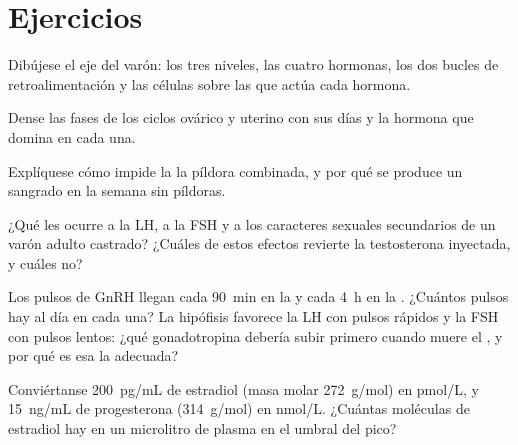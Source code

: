 \section{Ejercicios}

\begin{exercise}[$\star$]\label{exo:b2:reproductive-hormones:1}
Dibújese el eje del varón: los tres niveles, las cuatro hormonas, los dos
bucles de retroalimentación y las células sobre las que actúa cada
hormona.
\end{exercise}

\begin{exercise}[$\star$]\label{exo:b2:reproductive-hormones:2}
Dense las fases de los ciclos ovárico y uterino con sus días y la hormona
que domina en cada una.
\end{exercise}

\begin{exercise}[$\star$]\label{exo:b2:reproductive-hormones:3}
Explíquese cómo impide la  la píldora combinada, y por qué se
produce un sangrado en la semana sin píldoras.
\end{exercise}

\begin{exercise}[$\star$]\label{exo:b2:reproductive-hormones:4}
¿Qué les ocurre a la LH, a la FSH y a los caracteres sexuales secundarios
de un varón adulto castrado? ¿Cuáles de estos efectos revierte la
testosterona inyectada, y cuáles no?
\end{exercise}

\begin{exercise}[$\star\star$]\label{exo:b2:reproductive-hormones:5}
Los pulsos de GnRH llegan cada \qty{90}{min} en la  y cada
\qty{4}{h} en la . ¿Cuántos pulsos hay al día en cada una? La
hipófisis favorece la LH con pulsos rápidos y la FSH con pulsos lentos:
¿qué gonadotropina debería subir primero cuando muere el , y
por qué es esa la adecuada?
\end{exercise}

\begin{exercise}[$\star\star$]\label{exo:b2:reproductive-hormones:6}
Conviértanse \qty{200}{pg/mL} de estradiol (masa molar
\qty{272}{g/mol}) en \unit{pmol/L}, y \qty{15}{ng/mL} de
progesterona (\qty{314}{g/mol}) en \unit{nmol/L}. ¿Cuántas moléculas de
estradiol hay en un microlitro de plasma en el umbral del pico?
\end{exercise}

